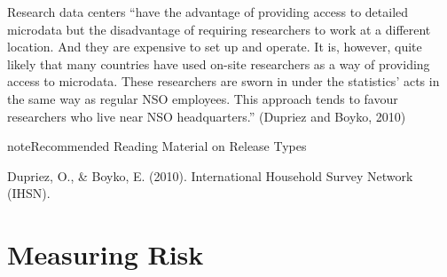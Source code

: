 \documentclass[letterpaper,10pt,english]{sphinxmanual}
\begin{document}
Research data centers “have the advantage of providing access to
detailed microdata but the disadvantage of requiring researchers to work
at a different location. And they are expensive to set up and operate.
It is, however, quite likely that many countries have used on-site
researchers as a way of providing access to microdata. These researchers
are sworn in under the statistics’ acts in the same way as regular NSO
employees. This approach tends to favour researchers who live near NSO
headquarters.” (Dupriez and Boyko, 2010)

\begin{sphinxadmonition}{note}{Recommended Reading Material on Release Types}

Dupriez, O., \& Boyko, E. (2010).  International Household Survey
Network (IHSN).
\end{sphinxadmonition}


\chapter{Measuring Risk}
\label{\detokenize{measure_risk::doc}}\label{\detokenize{measure_risk:measuring-risk}}
\end{document}
